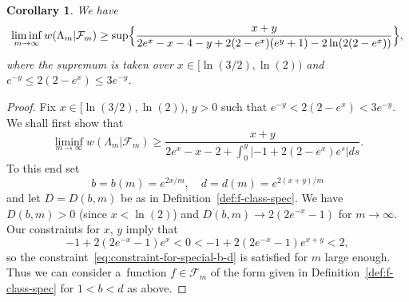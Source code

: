 \documentclass[a4paper]{amsart} %
\newtheorem{corollary}[theorem]{Corollary} %
\theoremstyle{definition}
\theoremstyle{remark}
\numberwithin{equation}{section}
\newcommand*{\weakconstrestricted}[2]{w(#1|#2)} %
\newcommand*{\fclassspec}[1]{\mathcal{F}_{#1}}
\newcommand*{\dOne}{D}%
\begin{document}
\begin{corollary}
	\label{cor:lower-bound-asymptotic-special-b-c-d-alternate-expression}
	We have 
	\begin{equation*}
	\liminf_{m\to \infty} \weakconstrestricted{\Lambda_m}{\fclassspec{m}}
	\geq
	\sup\Bigl\{ 
	\frac{x + y}{2e^x - x -4  - y + 2(2-e^x) (e^y + 1) -2\ln(2(2-e^x))}
	\Bigr\},
	\end{equation*}
	where the supremum is taken over
	$x\in [\ln(3/2), \ln(2))$
	and $e^{-y} \leq 2(2-e^x) \leq  3e^{-y}$.
\end{corollary}

\begin{proof}
	Fix $x\in [\ln(3/2), \ln(2))$, $y>0$ such that $e^{-y} < 2(2-e^x) <  3e^{-y}$.
	We shall first show that
	\begin{equation}
	\label{eq:ladida}
	\liminf_{m\to \infty} \weakconstrestricted{\Lambda_m}{\fclassspec{m}}
	\geq 	\frac{x + y }{2e^x - x -2+\int_0^y |-1 + 2(2-e^x) e^s | ds}.
	\end{equation}
	To this end set
	\begin{equation*}
	b = b(m) = e^{2x/m},\quad
	d = d(m) = e^{2(x+y)/m}
	\end{equation*}
	and let $\dOne = \dOne(b,m)$ be as in Definition~\ref{def:f-class-spec}.
	We have $D(b,m) > 0$ (since $x<\ln(2)$)
	and
	$\dOne(b,m)\to 2(2e^{-x} -1)$ for $m\to\infty$.
	Our constraints for $x$, $y$ imply that
		\begin{equation*}
		 -1 + 2(2e^{-x} - 1) e^x < 0 <  -1 + 2(2e^{-x} - 1) e^{x+y} < 2,
		\end{equation*}	
		so the constraint~\eqref{eq:constraint-for-special-b-d} is satisfied for $m$ large enough.
	Thus we can consider a~function $f\in\fclassspec{m}$ of the form given in Definition~\ref{def:f-class-spec}
	for $1 < b < d$ as above.
	


\end{proof}
\end{document}
